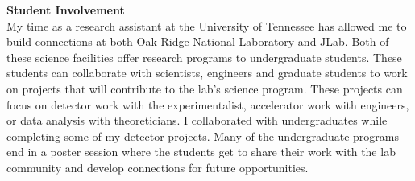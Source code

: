 \documentclass[12pt,letterpaper]{article}
\begin{document}
\noindent\textbf{Student Involvement}\\
\indent My time as a research assistant at the University of Tennessee has allowed me to build connections at both Oak Ridge National Laboratory and JLab.  Both of these science facilities offer research programs to undergraduate students. These students can collaborate with scientists, engineers and graduate students to work on projects that will contribute to the lab's science program. These projects can focus on detector work with the experimentalist, accelerator work with engineers, or data analysis with theoreticians. I collaborated with undergraduates while completing some of my detector projects. Many of the undergraduate programs end in a poster session where the students get to share their work with the lab community and develop connections for future opportunities.
\end{document}
